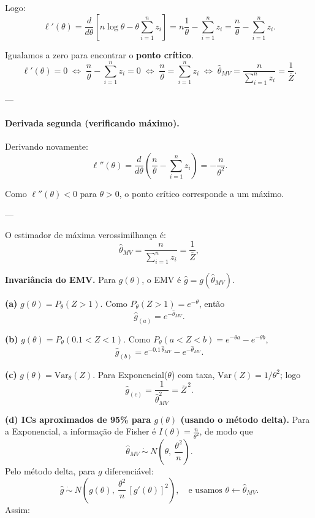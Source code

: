 Logo:
\[
\boxed{
\ell'(\theta)
=\frac{d}{d\theta}[n\log\theta-\theta\sum_{i=1}^n z_i]
=n\frac{1}{\theta}-\sum_{i=1}^n z_i
=\frac{n}{\theta}-\sum_{i=1}^n z_i.}
\]

Igualamos a zero para encontrar o \textbf{ponto crítico}. 
\[
\ell'(\theta)=0
\;\Longleftrightarrow\;
\frac{n}{\theta}-\sum_{i=1}^n z_i=0
\;\Longleftrightarrow\;
\frac{n}{\theta}=\sum_{i=1}^n z_i
\;\Longleftrightarrow\;
\widehat\theta_{MV}=\frac{n}{\sum_{i=1}^n z_i}
=\frac{1}{\overline Z}.
\]

---

\paragraph{Derivada segunda (verificando máximo).}
Derivando novamente:
\[
\ell''(\theta)
=\frac{d}{d\theta}\!\left(\frac{n}{\theta}-\sum_{i=1}^n z_i\right)
=-\frac{n}{\theta^2}.
\]

Como $\ell''(\theta)<0$ para $\theta>0$,
o ponto crítico corresponde a um máximo.

---

O estimador de máxima verossimilhança é:
\[
\boxed{\widehat\theta_{MV}=\frac{n}{\sum_{i=1}^n z_i}
=\frac{1}{\overline Z}},
\]

\medskip
\textbf{Invariância do EMV.} Para $g(\theta)$, o EMV é $\widehat g=g(\widehat\theta_{MV})$.

\bigskip
\textbf{(a) } $g(\theta)=P_\theta(Z>1)$.
Como $P_\theta(Z>1)=e^{-\theta}$, então
\[
\widehat g_{(a)}=e^{-\widehat\theta_{MV}}.
\]

\medskip
\textbf{(b) } $g(\theta)=P_\theta(0.1<Z<1)$.
Como $P_\theta(a<Z<b)=e^{-\theta a}-e^{-\theta b}$,
\[
\widehat g_{(b)}=e^{-0.1\,\widehat\theta_{MV}}-e^{-\widehat\theta_{MV}}.
\]

\medskip
\textbf{(c) } $g(\theta)=\mathrm{Var}_\theta(Z)$.
Para Exponencial($\theta$) com taxa, $\mathrm{Var}(Z)=1/\theta^2$; logo
\[
\widehat g_{(c)}=\frac{1}{\widehat\theta_{MV}^2}=\overline Z^{\,2}.
\]

\bigskip
\textbf{(d) ICs aproximados de 95\% para $g(\theta)$ (usando o método delta).}
Para a Exponencial, a informação de Fisher é $I(\theta)=\tfrac{n}{\theta^2}$,
de modo que
\[
\widehat\theta_{MV}\ \dot\sim\ N\!\left(\theta,\ \frac{\theta^2}{n}\right).
\]
Pelo método delta, para $g$ diferenciável:
\[
\widehat g\ \dot\sim\ N\!\left(g(\theta),\ \frac{\theta^2}{n}\,[g'(\theta)]^2\right),
\quad\text{e usamos } \theta\leftarrow\widehat\theta_{MV}.
\]
Assim:

